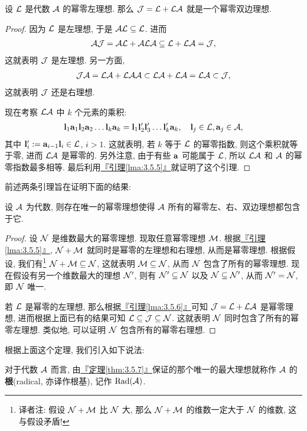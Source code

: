 \documentclass[lang=cn,zihao=-4,twoside,fontset=none]{textbook}
\makeatletter
\newcommand{\gt}{>}
\def\eq#1{\[\begin{aligned}{}#1\end{aligned}\]}
\newcommand{\thmref}[1]{\hyperref[#1]{『定理\textnormal{\ref*{#1}}』}}
\newcommand{\lmaref}[1]{\hyperref[#1]{『引理\textnormal{\ref*{#1}}』}}
\DeclareMathOperator{\Rad}{Rad}
\newcommand{\addterm}[2]{\textbf{#1}{(#2)}\index[nidx]{#1@\textbf{#1}(#2)}}
\makeatother
\begin{document}
\begin{lem}
    \label{lma:3.5.6}%
    设 ${\mathcal L}$ 是代数 ${\mathcal A}$ 的幂零左理想. 那么 ${\mathcal J}={\mathcal L}+{\mathcal L}{\mathcal A}$ 就是一个幂零双边理想.
\end{lem}
\begin{proof}
    因为 ${\mathcal L}$ 是左理想, 于是 ${\mathcal A}{\mathcal L}\subseteq{\mathcal L}$. 进而 
    \eq{
        \mA\mJ=\mA\mL + \mA\mL\mA\subseteq \mL+\mL\mA=\mJ,
    }
    这就表明 ${\mathcal J}$ 是左理想. 另一方面, 
    \eq{
        \mJ\mA=\mL\mA+\mL\mA\mA\subset\mL\mA+\mL\mA=\mL\mA\subset\mJ,
    }
    这就表明 ${\mathcal J}$ 还是右理想. 

    现在考察 ${\mathcal L}{\mathcal A}$ 中 $k$ 个元素的乘积:
    \eq{
        \bfl_1\bfa_1\bfl_2\bfa_2\dots\bfl_k\bfa_k = \bfl_1\bfl_2'\bfl_3'\dots\bfl_k'\bfa_k, \quad \bfl_j\in\mL,\bfa_j\in\mA,
    }
    其中 ${\mathbf l}_i':={\mathbf a}_{i-1}{\mathbf l}_i\in{\mathcal L}$, $i\gt 1$.  这就表明, 若 $k$ 等于 ${\mathcal L}$ 的幂零指数, 则这个乘积就等于零, 进而 ${\mathcal L}{\mathcal A}$ 是幂零的. 另外注意, 由于有些 ${\mathbf a}$ 可能属于 ${\mathcal L}$, 所以 ${\mathcal L}{\mathcal A}$ 和 ${\mathcal A}$ 的幂零指数最多相等. 最后利用\lmaref{lma:3.5.5}就证明了这个引理. 
\end{proof}

前述两条引理旨在证明下面的结果:

\begin{theorem}
    \label{thm:3.5.7}%
    设 ${\mathcal A}$ 为代数, 则存在唯一的幂零理想使得 ${\mathcal A}$ 所有的幂零左、右、双边理想都包含于它. 
\end{theorem}

\begin{proof}
    设 ${\mathcal N}$ 是维数最大的幂零理想. 现取任意幂零理想 ${\mathcal M}$. 根据\lmaref{lma:3.5.5}, ${\mathcal N}+{\mathcal M}$ 就同时是幂零的左理想和右理想, 从而是幂零理想. 根据假设, 我们有\footnote{译者注: 假设 ${\mathcal N}+{\mathcal M}$ 比 ${\mathcal N}$ 大, 那么 ${\mathcal N}+{\mathcal M}$ 的维数一定大于 ${\mathcal N}$ 的维数, 这与假设矛盾!} ${\mathcal N}+{\mathcal M}\subseteq{\mathcal N}$, 这就表明 ${\mathcal M}\subseteq{\mathcal N}$, 从而 ${\mathcal N}$ 包含了所有的幂零理想. 现在假设有另一个维数最大的理想 ${\mathcal N}'$, 则有 ${\mathcal N}'\subseteq{\mathcal N}$ 以及 ${\mathcal N}\subseteq{\mathcal N}'$, 从而  ${\mathcal N}'={\mathcal N}$, 即 ${\mathcal N}$ 唯一. 

    若 ${\mathcal L}$ 是幂零的左理想, 那么根据\lmaref{lma:3.5.6}可知 ${\mathcal J}={\mathcal L}+{\mathcal L}{\mathcal A}$ 是幂零理想, 进而根据上面已有的结果可知 ${\mathcal L}\subseteq{\mathcal J}\subseteq{\mathcal N}$. 这就表明 ${\mathcal N}$ 同时包含了所有的幂零左理想. 类似地, 可以证明 ${\mathcal N}$ 包含所有的幂零右理想. 
\end{proof}

根据上面这个定理, 我们引入如下说法:

\begin{defi}
    [代数的根]\label{def:3.5.8}%
    对于代数 ${\mathcal A}$ 而言, 由\thmref{thm:3.5.7}保证的那个唯一的最大理想就称作 ${\mathcal A}$ 的\addterm{根}{radical, 亦译作根基}, 记作 $\Rad(\mA)$.
\end{defi}
\end{document}
